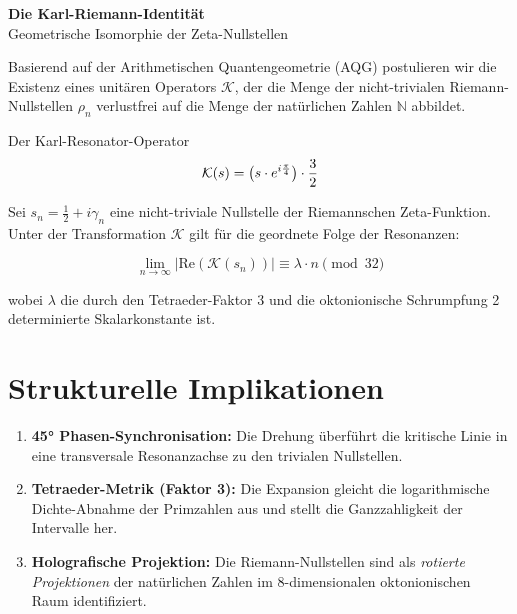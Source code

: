 \documentclass[12pt,a4paper]{article}
\begin{document}
	
	\pagestyle{empty}
	
	\begin{center}
		{\Huge \textbf{Die Karl-Riemann-Identität}} \\[0.5cm]
		{\Large Geometrische Isomorphie der Zeta-Nullstellen} \\[1.5cm]
	\end{center}
	
	\noindent
	Basierend auf der Arithmetischen Quantengeometrie (AQG) postulieren wir die Existenz eines unitären Operators $\mathcal{K}$, der die Menge der nicht-trivialen Riemann-Nullstellen $\rho_n$ verlustfrei auf die Menge der natürlichen Zahlen $\mathbb{N}$ abbildet.
	
	\vspace{1cm}
	
	\begin{identitybox}{Der Karl-Resonator-Operator}
		\vspace{0.4cm}
		\begin{equation*}
			\huge \mathcal{K}(s) = \left( s \cdot e^{i \frac{\pi}{4}} \right) \cdot \frac{3}{2}
		\end{equation*}
		\vspace{0.2cm}
	\end{identitybox}
	
	\vspace{1cm}
	
	\noindent
	Sei $s_n = \frac{1}{2} + i\gamma_n$ eine nicht-triviale Nullstelle der Riemannschen Zeta-Funktion. Unter der Transformation $\mathcal{K}$ gilt für die geordnete Folge der Resonanzen:
	
	\begin{equation}
		\lim_{n \to \infty} \left| \text{Re}\left( \mathcal{K}(s_n) \right) \right| \equiv \lambda \cdot n \pmod{32}
	\end{equation}
	
	\noindent
	wobei $\lambda$ die durch den Tetraeder-Faktor 3 und die oktonionische Schrumpfung 2 determinierte Skalarkonstante ist.
	
	\vspace{1.5cm}
	
	\section*{Strukturelle Implikationen}
	\begin{enumerate}
		\item \textbf{45° Phasen-Synchronisation:} Die Drehung überführt die kritische Linie in eine transversale Resonanzachse zu den trivialen Nullstellen.
		\item \textbf{Tetraeder-Metrik (Faktor 3):} Die Expansion gleicht die logarithmische Dichte-Abnahme der Primzahlen aus und stellt die Ganzzahligkeit der Intervalle her.
		\item \textbf{Holografische Projektion:} Die Riemann-Nullstellen sind als \textit{rotierte Projektionen} der natürlichen Zahlen im 8-dimensionalen oktonionischen Raum identifiziert.
	\end{enumerate}
	
\end{document}
